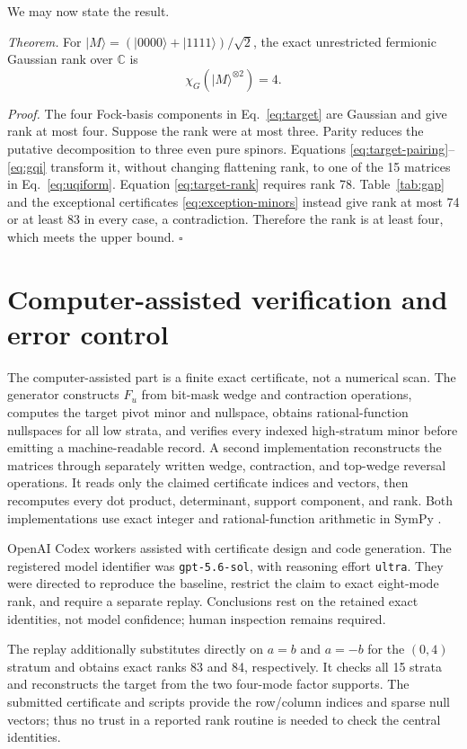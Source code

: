 \documentclass[aps,pra,reprint,groupedaddress,nofootinbib,longbibliography]{revtex4-2}
\newcommand{\ket}[1]{\lvert #1\rangle}
\newcommand{\C}{\mathbb{C}}
\begin{document}
We may now state the result.

\textit{Theorem.}  For $\ket M=(\ket{0000}+\ket{1111})/\sqrt2$, the exact
unrestricted fermionic Gaussian rank over $\C$ is
\begin{equation}
 \boxed{\chi_G(\ket M^{\otimes2})=4}.
\end{equation}

\textit{Proof.}  The four Fock-basis components in Eq.~\eqref{eq:target} are
Gaussian and give rank at most four.  Suppose the rank were at most three.
Parity reduces the putative decomposition to three even pure spinors.  Equations
\eqref{eq:target-pairing}--\eqref{eq:gqi} transform it, without changing
flattening rank, to one of the 15 matrices in Eq.~\eqref{eq:uqiform}.  Equation
\eqref{eq:target-rank} requires rank 78.  Table~\ref{tab:gap} and the exceptional
certificates \eqref{eq:exception-minors} instead give rank at most 74 or at
least 83 in every case, a contradiction.  Therefore the rank is at least four,
which meets the upper bound. \hfill$\square$

\section{Computer-assisted verification and error control}
\label{sec:verification}

The computer-assisted part is a finite exact certificate, not a numerical scan.
The generator constructs $F_u$ from bit-mask wedge and contraction operations,
computes the target pivot minor and nullspace, obtains rational-function
nullspaces for all low strata, and verifies every indexed high-stratum minor
before emitting a machine-readable record.  A second implementation reconstructs
the matrices through separately written wedge, contraction, and top-wedge
reversal operations.  It reads only the claimed certificate indices and vectors,
then recomputes every dot product, determinant, support component, and rank.
Both implementations use exact integer and rational-function arithmetic in
SymPy \cite{SymPy2017}.

OpenAI Codex workers assisted with certificate design and code generation.  The
registered model identifier was \texttt{gpt-5.6-sol}, with reasoning effort
\texttt{ultra}.  They were directed to reproduce the baseline, restrict the claim
to exact eight-mode rank, and require a separate replay.  Conclusions rest on the
retained exact identities, not model confidence; human inspection remains required.

The replay additionally substitutes directly on $a=b$ and $a=-b$ for the
$(0,4)$ stratum and obtains exact ranks 83 and 84, respectively.  It checks all
15 strata and reconstructs the target from the two four-mode factor supports.
The submitted certificate and scripts provide the row/column indices and sparse
null vectors; thus no trust in a reported rank routine is needed to check the
central identities.
\end{document}

